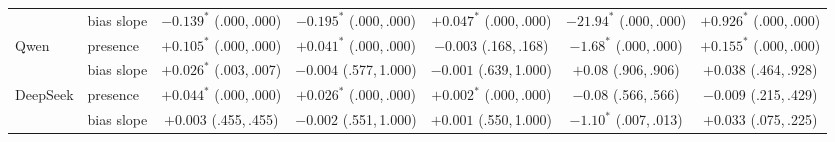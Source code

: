 \documentclass{article}
\begin{document}
\begin{table}[H]
\begin{tabular}{llccccc}
                         & bias slope & \makecell{$-0.139^{*}$\\{\scriptsize(.000,\,.000)}} & \makecell{$-0.195^{*}$\\{\scriptsize(.000,\,.000)}} & \makecell{$+0.047^{*}$\\{\scriptsize(.000,\,.000)}} & \makecell{$-21.94^{*}$\\{\scriptsize(.000,\,.000)}} & \makecell{$+0.926^{*}$\\{\scriptsize(.000,\,.000)}} \\
    \cmidrule(lr){1-7}
    \multirow{2}{*}{Qwen} & presence   & \makecell{$+0.105^{*}$\\{\scriptsize(.000,\,.000)}} & \makecell{$+0.041^{*}$\\{\scriptsize(.000,\,.000)}} & \makecell{$-0.003$\\{\scriptsize(.168,\,.168)}} & \makecell{$-1.68^{*}$\\{\scriptsize(.000,\,.000)}} & \makecell{$+0.155^{*}$\\{\scriptsize(.000,\,.000)}} \\
                          & bias slope & \makecell{$+0.026^{*}$\\{\scriptsize(.003,\,.007)}} & \makecell{$-0.004$\\{\scriptsize(.577,\,1.000)}} & \makecell{$-0.001$\\{\scriptsize(.639,\,1.000)}} & \makecell{$+0.08$\\{\scriptsize(.906,\,.906)}} & \makecell{$+0.038$\\{\scriptsize(.464,\,.928)}} \\
    \cmidrule(lr){1-7}
    \multirow{2}{*}{DeepSeek} & presence   & \makecell{$+0.044^{*}$\\{\scriptsize(.000,\,.000)}} & \makecell{$+0.026^{*}$\\{\scriptsize(.000,\,.000)}} & \makecell{$+0.002^{*}$\\{\scriptsize(.000,\,.000)}} & \makecell{$-0.08$\\{\scriptsize(.566,\,.566)}} & \makecell{$-0.009$\\{\scriptsize(.215,\,.429)}} \\
                              & bias slope & \makecell{$+0.003$\\{\scriptsize(.455,\,.455)}} & \makecell{$-0.002$\\{\scriptsize(.551,\,1.000)}} & \makecell{$+0.001$\\{\scriptsize(.550,\,1.000)}} & \makecell{$-1.10^{*}$\\{\scriptsize(.007,\,.013)}} & \makecell{$+0.033$\\{\scriptsize(.075,\,.225)}} \\
    \bottomrule
  \end{tabular}
\end{table}
\end{document}
